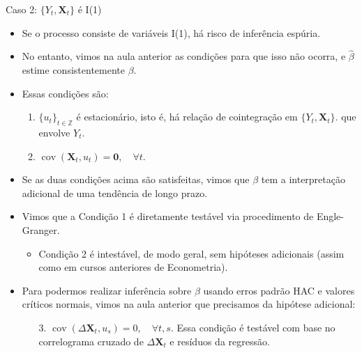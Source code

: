 \documentclass[11pt]{beamer}
\begin{document}
\begin{frame}{Caso 2: $\{Y_t,\boldsymbol{X}_t\}$ é I(1)}
	\begin{itemize}
		\item Se o processo consiste de variáveis I(1), há risco de inferência espúria.
		\item No entanto, vimos na aula anterior as condições para que isso não ocorra, e $\hat \beta$ estime consistentemente $\beta$.
		\item Essas condições são:
		\begin{enumerate}
			\item $\{u_t\}_{t \in \mathbb{Z}}$ é estacionário, isto é, há relação de cointegração em $\{Y_t,\boldsymbol{X}_t\}$. {\color{blue}que envolve $Y_t$}.
			\item $\operatorname{cov}(\boldsymbol{X}_t, u_t)=\boldsymbol{0}, \quad \forall t$.
		\end{enumerate}
		\item Se as duas condições acima são satisfeitas, vimos que $\beta$ {\color{blue}tem a interpretação adicional de uma tendência de longo prazo}.
		\item Vimos que a Condição 1 é diretamente testável via procedimento de Engle-Granger.
		\begin{itemize}
			\item Condição 2 é intestável, de modo geral, sem hipóteses adicionais (assim como em cursos anteriores de Econometria).
		\end{itemize}
		\item Para podermos realizar inferência sobre $\beta$ usando erros padrão HAC e valores críticos normais, vimos na aula anterior que precisamos da hipótese adicional:
		\begin{enumerate}
			\item[3.] $\operatorname{cov}(\Delta \boldsymbol{X}_t, u_s) = 0, \quad  \forall t,s$. Essa condição é testável com base no correlograma cruzado de $\Delta \boldsymbol{X}_t$ e resíduos da regressão.
		\end{enumerate}
	\end{itemize}
	\end{frame}
	
\end{document}
